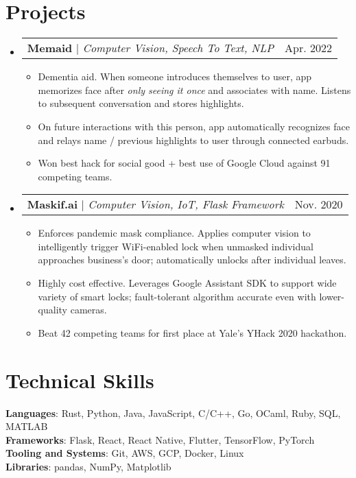 \documentclass[letterpaper,10pt]{article}
\makeatletter
\newcommand{\resumeItem}[1]{
  \item\small{
    {#1 \vspace{-2pt}}
  }
}
\newcommand{\resumeProjectHeading}[2]{
    \item
    \begin{tabular*}{0.97\textwidth}{l@{\extracolsep{\fill}}r}
      \small#1 & #2 \\
    \end{tabular*}\vspace{-7pt}
}
\newcommand{\resumeSubHeadingListStart}{\begin{itemize}[leftmargin=0.15in, label={}]}
\newcommand{\resumeSubHeadingListEnd}{\end{itemize}}
\newcommand{\resumeItemListStart}{\begin{itemize}}
\newcommand{\resumeItemListEnd}{\end{itemize}\vspace{-5pt}}
\makeatother
\begin{document}
\section{Projects}
    \resumeSubHeadingListStart
      \resumeProjectHeading
          {\textbf{Memaid} $|$ \emph{Computer Vision, Speech To Text, NLP}}{Apr. 2022}
          \resumeItemListStart
            \resumeItem{Dementia aid. When someone introduces themselves to user, app memorizes face after \textit{only seeing it once} and associates with name. Listens to subsequent conversation and stores highlights.}
            \resumeItem{On future interactions with this person, app automatically recognizes face and relays name / previous highlights to user through connected earbuds.}
            \resumeItem{Won best hack for social good + best use of Google Cloud against 91 competing teams.}
          \resumeItemListEnd
      \resumeProjectHeading
          {\textbf{Maskif.ai} $|$ \emph{Computer Vision, IoT, Flask Framework}}{Nov. 2020}
          \resumeItemListStart
            \resumeItem{Enforces pandemic mask compliance. Applies computer vision to intelligently trigger WiFi-enabled lock when unmasked individual approaches business's door; automatically unlocks after individual leaves.}
            \resumeItem{Highly cost effective. Leverages Google Assistant SDK to support wide variety of smart locks; fault-tolerant algorithm accurate even with lower-quality cameras.}
            \resumeItem{Beat 42 competing teams for first place at Yale's YHack 2020 hackathon.}
          \resumeItemListEnd
    \resumeSubHeadingListEnd








\section{Technical Skills}
 \begin{itemize}[leftmargin=0.15in, label={}]
    \small{\item{
     \textbf{Languages}{: Rust, Python, Java, JavaScript, C/C++, Go, OCaml, Ruby, SQL, MATLAB} \\
     \textbf{Frameworks}{: Flask, React, React Native, Flutter, TensorFlow, PyTorch} \\
     \textbf{Tooling and Systems}{: Git, AWS, GCP, Docker, Linux} \\
     \textbf{Libraries}{: pandas, NumPy, Matplotlib}
    }}
 \end{itemize}
\end{document}
